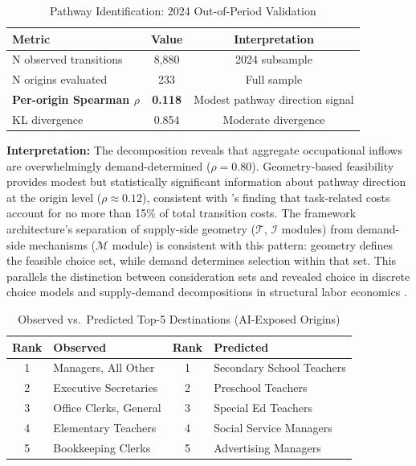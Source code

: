 \documentclass[12pt]{article}
\begin{document}
\begin{table}[h!]
\centering
\caption{Pathway Identification: 2024 Out-of-Period Validation}
\label{tab:pathway-validation}
\begin{tabular}{lcc}
\toprule
\textbf{Metric} & \textbf{Value} & \textbf{Interpretation} \\
\midrule
N observed transitions & 8,880 & 2024 subsample \\
N origins evaluated & 233 & Full sample \\
\textbf{Per-origin Spearman $\rho$} & \textbf{0.118} & Modest pathway direction signal \\
KL divergence & 0.854 & Moderate divergence \\
\bottomrule
\end{tabular}
\end{table}


\textbf{Interpretation:} The decomposition reveals that aggregate occupational inflows are overwhelmingly demand-determined ($\rho = 0.80$). Geometry-based feasibility provides modest but statistically significant information about pathway direction at the origin level ($\rho \approx 0.12$), consistent with \citet{CortesGallipoli2018}'s finding that task-related costs account for no more than 15\% of total transition costs. The framework architecture's separation of supply-side geometry ($\mathcal{T}$, $\mathcal{I}$ modules) from demand-side mechanisms ($\mathcal{M}$ module) is consistent with this pattern: geometry defines the feasible choice set, while demand determines selection within that set. This parallels the distinction between consideration sets and revealed choice in discrete choice models \citep{BarseghyanEtAl2021} and supply-demand decompositions in structural labor economics \citep{LeeWolpin2006}.


\begin{table}[h!]
\centering
\caption{Observed vs.\ Predicted Top-5 Destinations (AI-Exposed Origins)}
\label{tab:observed-vs-predicted}
\begin{tabular}{cl|cl}
\toprule
\textbf{Rank} & \textbf{Observed} & \textbf{Rank} & \textbf{Predicted} \\
\midrule
1 & Managers, All Other & 1 & Secondary School Teachers \\
2 & Executive Secretaries & 2 & Preschool Teachers \\
3 & Office Clerks, General & 3 & Special Ed Teachers \\
4 & Elementary Teachers & 4 & Social Service Managers \\
5 & Bookkeeping Clerks & 5 & Advertising Managers \\
\bottomrule
\end{tabular}
\end{table}
\end{document}
